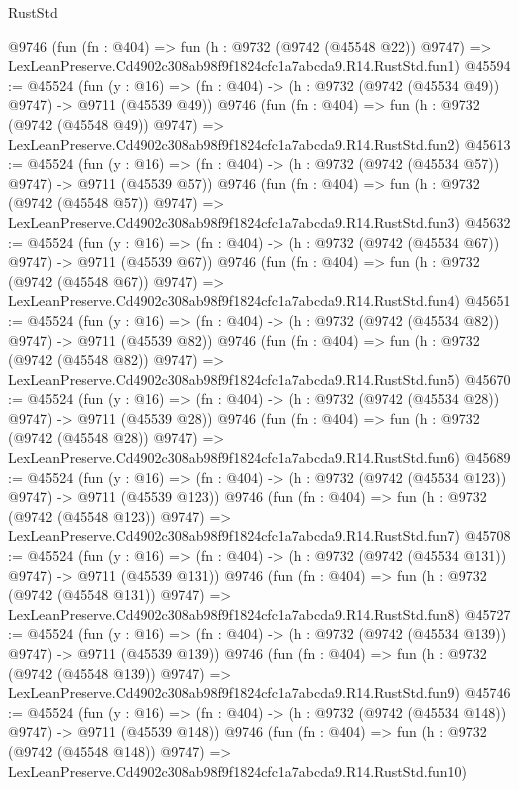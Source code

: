 \begin{lexlean}{RustStd}
\begin{coremodule}
    @9746
    (fun (fn : @404) =>
    fun (h : @9732 (@9742 (@45548 @22)) @9747) =>
    LexLeanPreserve.Cd4902c308ab98f9f1824cfc1a7abcda9.R14.RustStd.fun1)
@45594 := @45524
    (fun (y : @16) => (fn : @404) -> (h : @9732 (@9742 (@45534 @49)) @9747) -> @9711 (@45539 @49))
    @9746
    (fun (fn : @404) =>
    fun (h : @9732 (@9742 (@45548 @49)) @9747) =>
    LexLeanPreserve.Cd4902c308ab98f9f1824cfc1a7abcda9.R14.RustStd.fun2)
@45613 := @45524
    (fun (y : @16) => (fn : @404) -> (h : @9732 (@9742 (@45534 @57)) @9747) -> @9711 (@45539 @57))
    @9746
    (fun (fn : @404) =>
    fun (h : @9732 (@9742 (@45548 @57)) @9747) =>
    LexLeanPreserve.Cd4902c308ab98f9f1824cfc1a7abcda9.R14.RustStd.fun3)
@45632 := @45524
    (fun (y : @16) => (fn : @404) -> (h : @9732 (@9742 (@45534 @67)) @9747) -> @9711 (@45539 @67))
    @9746
    (fun (fn : @404) =>
    fun (h : @9732 (@9742 (@45548 @67)) @9747) =>
    LexLeanPreserve.Cd4902c308ab98f9f1824cfc1a7abcda9.R14.RustStd.fun4)
@45651 := @45524
    (fun (y : @16) => (fn : @404) -> (h : @9732 (@9742 (@45534 @82)) @9747) -> @9711 (@45539 @82))
    @9746
    (fun (fn : @404) =>
    fun (h : @9732 (@9742 (@45548 @82)) @9747) =>
    LexLeanPreserve.Cd4902c308ab98f9f1824cfc1a7abcda9.R14.RustStd.fun5)
@45670 := @45524
    (fun (y : @16) => (fn : @404) -> (h : @9732 (@9742 (@45534 @28)) @9747) -> @9711 (@45539 @28))
    @9746
    (fun (fn : @404) =>
    fun (h : @9732 (@9742 (@45548 @28)) @9747) =>
    LexLeanPreserve.Cd4902c308ab98f9f1824cfc1a7abcda9.R14.RustStd.fun6)
@45689 := @45524
    (fun (y : @16) => (fn : @404) -> (h : @9732 (@9742 (@45534 @123)) @9747) -> @9711 (@45539 @123))
    @9746
    (fun (fn : @404) =>
    fun (h : @9732 (@9742 (@45548 @123)) @9747) =>
    LexLeanPreserve.Cd4902c308ab98f9f1824cfc1a7abcda9.R14.RustStd.fun7)
@45708 := @45524
    (fun (y : @16) => (fn : @404) -> (h : @9732 (@9742 (@45534 @131)) @9747) -> @9711 (@45539 @131))
    @9746
    (fun (fn : @404) =>
    fun (h : @9732 (@9742 (@45548 @131)) @9747) =>
    LexLeanPreserve.Cd4902c308ab98f9f1824cfc1a7abcda9.R14.RustStd.fun8)
@45727 := @45524
    (fun (y : @16) => (fn : @404) -> (h : @9732 (@9742 (@45534 @139)) @9747) -> @9711 (@45539 @139))
    @9746
    (fun (fn : @404) =>
    fun (h : @9732 (@9742 (@45548 @139)) @9747) =>
    LexLeanPreserve.Cd4902c308ab98f9f1824cfc1a7abcda9.R14.RustStd.fun9)
@45746 := @45524
    (fun (y : @16) => (fn : @404) -> (h : @9732 (@9742 (@45534 @148)) @9747) -> @9711 (@45539 @148))
    @9746
    (fun (fn : @404) =>
    fun (h : @9732 (@9742 (@45548 @148)) @9747) =>
    LexLeanPreserve.Cd4902c308ab98f9f1824cfc1a7abcda9.R14.RustStd.fun10)

\end{coremodule}
\end{lexlean}
